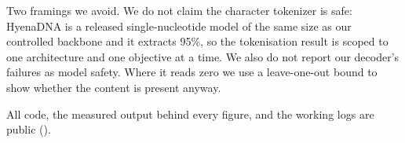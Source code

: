 Two framings we avoid. We do not claim the character tokenizer is safe: HyenaDNA is a released
single-nucleotide model of the same size as our controlled backbone and it extracts 95\%, so the
tokenisation result is scoped to one architecture and one objective at a time. We also do not report
our decoder's failures as model safety. Where it reads zero we use a leave-one-out bound to show
whether the content is present anyway.

All code, the measured output behind every figure, and the working logs are public
(\CODEURL).
